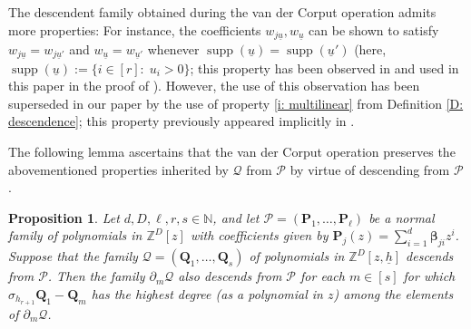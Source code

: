 \documentclass[11pt]{amsart}
\newtheorem{proposition}[lemma]{Proposition}
\theoremstyle{definition}
\newcommand{\N}{{\mathbb N}}
\newcommand{\Z}{{\mathbb Z}}
\newcommand{\CP}{{\mathcal P}}
\newcommand{\CQ}{{\mathcal Q}}
\newcommand{\bp}{{\mathbf{P}}}
\newcommand{\p}{{\mathbf{P}}}
\newcommand{\q}{{\mathbf{Q}}}
\newcommand{\bbeta}{{\boldsymbol{\beta}}}
\newcommand{\uh}{{\underline{h}}}
\newcommand{\uu}{{\underline{u}}}
\DeclareMathOperator{\supp}{supp}
\begin{document}
          
The descendent family obtained during the van der Corput operation admits more properties: For instance, the coefficients $w_{j\uu}, w_\uu$ can be shown to satisfy $w_{j\uu} = w_{j\uu'}$ and $w_\uu = w_{\uu'}$ whenever $\supp(\uu) = \supp(\uu')$ (here, $\supp(\uu):=\{i\in[r]:\; u_i>0\}$; this property has been observed in \cite[Definition 5.5 (P3)]{DKS22} and used in this paper in the proof of \cite[Proposition 5.7]{DKS22}). However, the use of this observation has been superseded in our paper by the use of property \eqref{i: multilinear} from Definition \ref{D: descendence}; this property previously appeared implicitly in \cite{Pel20, Ts22}.



    The following lemma ascertains that the van der Corput operation preserves the abovementioned properties inherited by $\CQ$ from $\CP$ by virtue of descending from $\CP$.
    \begin{proposition}\label{P: vdC preserves descendancy}
        Let $d, D, \ell,r, s\in\N$, and let $\CP = (\p_1, \ldots, \p_\ell)$ be a normal family of polynomials in $\Z^D[z]$ with coefficients given by $\bp_j(z) = \sum_{i=1}^d \bbeta_{ji}z^i$.
        Suppose that the family $\CQ = (\q_1, \ldots, \q_s)$ of polynomials in $\Z^D[z,\uh]$ descends from $\CP$. Then the family $\partial_m \CQ$ also descends from $\CP$ for each $m\in[s]$ for which $\sigma_{h_{r+1}}{\q}_1-{\q}_m$
        has the highest degree (as a polynomial in $z$) among the elements of $\partial_m \CQ$.
    \end{proposition}
 
\end{document}
